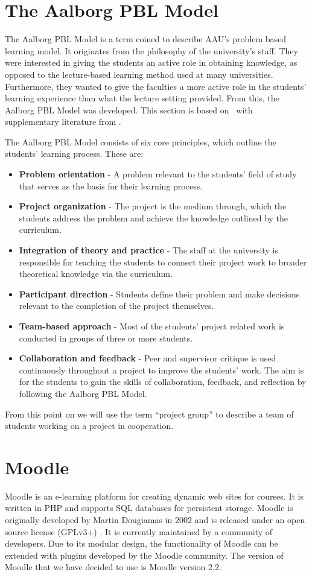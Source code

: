 \section{The Aalborg PBL Model}
\label{sub:aaupbl}
The Aalborg PBL Model is a term coined to describe AAU's problem based learning model. 
It originates from the philosophy of the university's staff. 
They were interested in giving the students an active role in obtaining knowledge, as opposed to the lecture-based learning method used at many universities.
Furthermore, they wanted to give the faculties a more active role in the students' learning experience than what the lecture setting provided. 
From this, the Aalborg PBL Model was developed. 
This section is based on~\citep{Barge10} with supplementary literature from \cite[pp.~9-16]{theaalborgpblmodel2004}.

The Aalborg PBL Model consists of six core principles, which outline the students' learning process. 
These are:
\begin{itemize}
	\item \textbf{Problem orientation} - A problem relevant to the students' field of study that serves as the basis for their learning process.
	\item \textbf{Project organization} - The project is the medium through, which the students address the problem and achieve the knowledge outlined by the curriculum.
	\item \textbf{Integration of theory and practice} - The staff at the university is responsible for teaching the students to connect their project work to broader theoretical knowledge via the curriculum.
	\item \textbf{Participant direction} - Students define their problem and make decisions relevant to the completion of the project themselves.
	\item \textbf{Team-based approach} - Most of the students' project related work is conducted in groups of three or more students.
	\item \textbf{Collaboration and feedback} - Peer and supervisor critique is used continuously throughout a project to improve the students' work.
	The aim is for the students to gain the skills of collaboration, feedback, and reflection by following the Aalborg PBL Model. 
\end{itemize}
From this point on we will use the term ``project group'' to describe a team of students working on a project in cooperation.


\section{Moodle}
\label{sec:Moodle}
Moodle is an e-learning platform for creating dynamic web sites for courses. 
It is written in PHP and supports SQL databases for persistent storage.
Moodle is originally developed by Martin Dougiamas in 2002 and is released under an open source license (GPLv3+) \citep{gpl}\cite{moodlelicense}.
It is currently maintained by a community of developers. 
Due to its modular design, the functionality of Moodle can be extended with plugins developed by the Moodle community.
The version of Moodle that we have decided to use is Moodle version 2.2.

